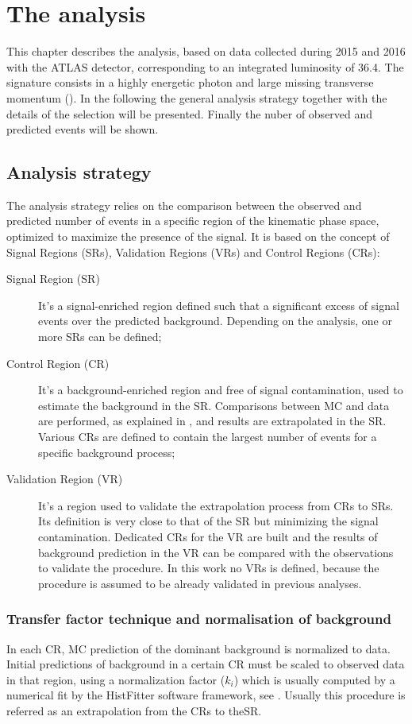 \chapter{The \mph analysis}
\label{chapt:mph}
\lettrine{T}{}his chapter describes the \mph analysis, based on data collected during 2015 and 2016 with the ATLAS detector, corresponding to an integrated luminosity of \SI{36.4}{\ifb}.
The \mph signature consists in a highly energetic photon and large missing transverse momentum (\met). In the following the general analysis strategy together with the details of the selection will be presented. Finally the nuber of observed and predicted  events will be shown.

\section{Analysis strategy}
The \mph analysis strategy relies on the comparison between the observed and predicted number of events in a specific region of the kinematic phase space, optimized to maximize the presence of the signal. It is based on the concept of Signal Regions (SRs), Validation Regions (VRs) and Control Regions (CRs):
\begin{description}
\item[Signal Region (SR)] It's a signal-enriched region defined such that a significant excess of signal events over the predicted background. Depending on the analysis, one or more SRs can be defined;
\item[Control Region (CR)] It's a background-enriched region and free of signal contamination, used to estimate the background in the SR. Comparisons between MC and data are performed, as explained in \Sect{\ref{sec:simfit}}, and results are extrapolated in the SR. Various CRs are defined to contain the largest number of events for a specific background process;
\item[Validation Region (VR)] It's a region used to validate the extrapolation process from CRs to SRs. Its definition is very close to that of the SR but minimizing the signal contamination. Dedicated CRs for the VR are built and the results of background prediction in the VR can be compared with the observations to validate the procedure.
In this work no VRs is defined, because the procedure is assumed to be already validated in previous analyses.
\end{description}

\subsection{Transfer factor technique and normalisation of background}
\label{sec:kfactor}
In each CR, MC prediction of the dominant background is normalized to data. Initial predictions of background in a certain CR must be scaled to observed data in that region, using a normalization factor ($k_{i}$) which is usually computed by a numerical fit by the HistFitter software framework, see \Sect{\ref{sec:hf}}. Usually this procedure is referred as an extrapolation from the CRs to  theSR.

